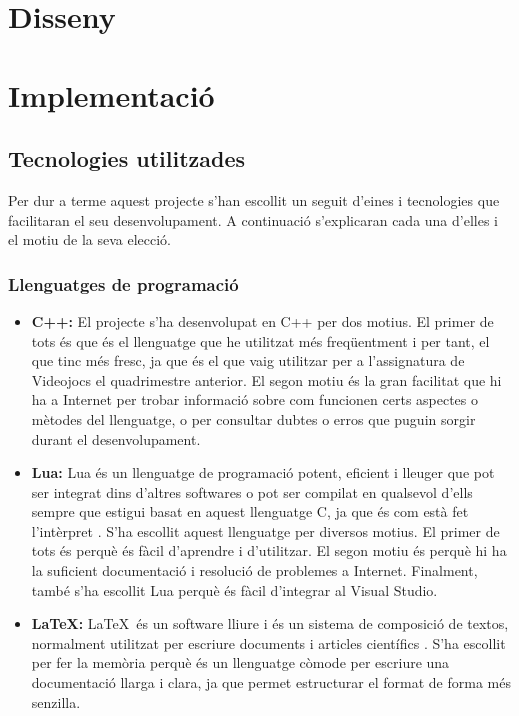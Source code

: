 \documentclass[a4paper]{article}
\begin{document}
\newpage
\section{Disseny}

\newpage
\section{Implementació}
\subsection{Tecnologies utilitzades}
Per dur a terme aquest projecte s'han escollit un seguit d'eines i tecnologies que facilitaran el seu desenvolupament. A continuació s'explicaran cada una d'elles i el motiu de la seva elecció.

\subsubsection{Llenguatges de programació}
\begin{itemize}
    \item \textbf{C++:} El projecte s'ha desenvolupat en C++ per dos motius. El primer de tots és que és el llenguatge que he utilitzat més freqüentment i per tant, el que tinc més fresc, ja que és el que vaig utilitzar per a l'assignatura de Videojocs el quadrimestre anterior. El segon motiu és la gran facilitat que hi ha a Internet per trobar informació sobre com funcionen certs aspectes o mètodes del llenguatge, o per consultar dubtes o erros que puguin sorgir durant el desenvolupament. 
    \item \textbf{Lua:} Lua és un llenguatge de programació potent, eficient i lleuger que pot ser integrat dins d'altres softwares o pot ser compilat en qualsevol d'ells sempre que estigui basat en aquest llenguatge C, ja que és com està fet l'intèrpret \cite{luaAbout}. S'ha escollit aquest llenguatge per diversos motius. El primer de tots és perquè és fàcil d'aprendre i d'utilitzar. El segon motiu és perquè hi ha la suficient documentació i resolució de problemes a Internet. Finalment, també s'ha escollit Lua perquè és fàcil d'integrar al Visual Studio.
    \item \textbf{\LaTeX:} \LaTeX \, és un software lliure i és un sistema de composició de textos, normalment utilitzat per escriure documents i articles científics \cite{wikipediaLatex}. S'ha escollit per fer la memòria perquè és un llenguatge còmode per escriure una documentació llarga i clara, ja que permet estructurar el format de forma més senzilla.
\end{itemize}
\end{document}
